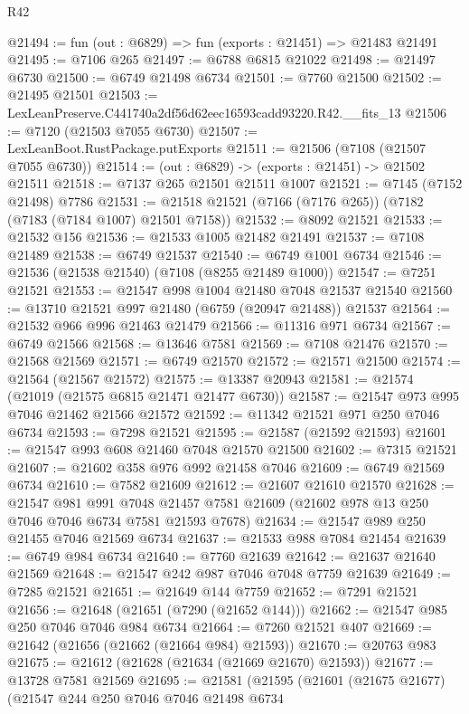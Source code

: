 \begin{lexlean}{R42}
\begin{coremodule}
{@21494 := fun (out : @6829) => fun (exports : @21451) => @21483 @21491
@21495 := @7106 @265
@21497 := @6788 @6815 @21022
@21498 := @21497 @6730
@21500 := @6749 @21498 @6734
@21501 := @7760 @21500
@21502 := @21495 @21501
@21503 := LexLeanPreserve.C441740a2df56d62eec16593cadd93220.R42.__fits_13
@21506 := @7120 (@21503 @7055 @6730)
@21507 := LexLeanBoot.RustPackage.putExports
@21511 := @21506 (@7108 (@21507 @7055 @6730))
@21514 := (out : @6829) -> (exports : @21451) -> @21502 @21511
@21518 := @7137 @265 @21501 @21511 @1007
@21521 := @7145 (@7152 @21498) @7786
@21531 := @21518 @21521 (@7166 (@7176 @265)) (@7182 (@7183 (@7184 @1007) @21501 @7158))
@21532 := @8092 @21521
@21533 := @21532 @156
@21536 := @21533 @1005 @21482 @21491
@21537 := @7108 @21489
@21538 := @6749 @21537
@21540 := @6749 @1001 @6734
@21546 := @21536 (@21538 @21540) (@7108 (@8255 @21489 @1000))
@21547 := @7251 @21521
@21553 := @21547 @998 @1004 @21480 @7048 @21537 @21540
@21560 := @13710 @21521 @997 @21480 (@6759 (@20947 @21488)) @21537
@21564 := @21532 @966 @996 @21463 @21479
@21566 := @11316 @971 @6734
@21567 := @6749 @21566
@21568 := @13646 @7581
@21569 := @7108 @21476
@21570 := @21568 @21569
@21571 := @6749 @21570
@21572 := @21571 @21500
@21574 := @21564 (@21567 @21572)
@21575 := @13387 @20943
@21581 := @21574 (@21019 (@21575 @6815 @21471 @21477 @6730))
@21587 := @21547 @973 @995 @7046 @21462 @21566 @21572
@21592 := @11342 @21521 @971 @250 @7046 @6734
@21593 := @7298 @21521
@21595 := @21587 (@21592 @21593)
@21601 := @21547 @993 @608 @21460 @7048 @21570 @21500
@21602 := @7315 @21521
@21607 := @21602 @358 @976 @992 @21458 @7046
@21609 := @6749 @21569 @6734
@21610 := @7582 @21609
@21612 := @21607 @21610 @21570
@21628 := @21547
    @981
    @991
    @7048
    @21457
    @7581
    @21609
    (@21602 @978 @13 @250 @7046 @7046 @6734 @7581 @21593 @7678)
@21634 := @21547 @989 @250 @21455 @7046 @21569 @6734
@21637 := @21533 @988 @7084 @21454
@21639 := @6749 @984 @6734
@21640 := @7760 @21639
@21642 := @21637 @21640 @21569
@21648 := @21547 @242 @987 @7046 @7048 @7759 @21639
@21649 := @7285 @21521
@21651 := @21649 @144 @7759
@21652 := @7291 @21521
@21656 := @21648 (@21651 (@7290 (@21652 @144)))
@21662 := @21547 @985 @250 @7046 @7046 @984 @6734
@21664 := @7260 @21521 @407
@21669 := @21642 (@21656 (@21662 (@21664 @984) @21593))
@21670 := @20763 @983
@21675 := @21612 (@21628 (@21634 (@21669 @21670) @21593))
@21677 := @13728 @7581 @21569
@21695 := @21581
    (@21595
      (@21601
        (@21675 @21677)
        (@21547
          @244
          @250
          @7046
          @7046
          @21498
          @6734
}
\end{coremodule}
\end{lexlean}
